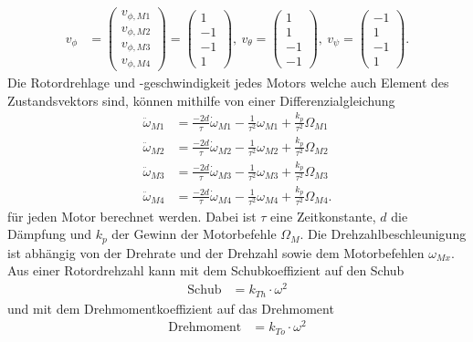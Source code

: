 \begin{align}
	v_{\phi} &= \begin{pmatrix}
		v_{\phi, M1}\\
		v_{\phi, M2}\\
		v_{\phi, M3}\\
		v_{\phi, M4}
	\end{pmatrix} =
	\begin{pmatrix}
		1\\
		-1\\
		-1\\
		1
	\end{pmatrix},\
	v_{\theta} =
	\begin{pmatrix}
		1\\
		1\\
		-1\\
		-1
	\end{pmatrix},\
	v_{\psi} =
	\begin{pmatrix}
		-1\\
		1\\
		-1\\
		1
	\end{pmatrix}.
\end{align}
Die Rotordrehlage und -geschwindigkeit jedes Motors welche auch Element des Zustandsvektors sind, können mithilfe von einer Differenzialgleichung
\begin{align}
	\ddot{\omega}_{M1} &= \frac{-2d}{\tau}\dot{\omega}_{M1} - \frac{1}{\tau^2}\omega_{M1} + \frac{k_p}{\tau^2}\Omega_{M1}\\
	\ddot{\omega}_{M2} &= \frac{-2d}{\tau}\dot{\omega}_{M2} - \frac{1}{\tau^2}\omega_{M2} + \frac{k_p}{\tau^2}\Omega_{M2}\\
	\ddot{\omega}_{M3} &= \frac{-2d}{\tau}\dot{\omega}_{M3} - \frac{1}{\tau^2}\omega_{M3} + \frac{k_p}{\tau^2}\Omega_{M3}\\
	\ddot{\omega}_{M4} &= \frac{-2d}{\tau}\dot{\omega}_{M4} - \frac{1}{\tau^2}\omega_{M4} + \frac{k_p}{\tau^2}\Omega_{M4}.
\end{align}
für jeden Motor berechnet werden.
Dabei ist $\tau$ eine Zeitkonstante, $d$ die Dämpfung und $k_p$ der Gewinn der Motorbefehle $\Omega_{M}$.
Die Drehzahlbeschleunigung ist abhängig von der Drehrate und der Drehzahl sowie dem Motorbefehlen $\omega_{Mx}$. Aus einer Rotordrehzahl kann mit dem Schubkoeffizient auf den Schub
\begin{align}
	\text{Schub} &= k_{Th}\cdot \omega^2
\end{align} und mit dem Drehmomentkoeffizient auf das Drehmoment
\begin{align}
	\text{Drehmoment} &= k_{To}\cdot \omega^2
\end{align}
